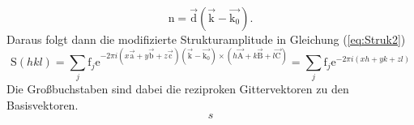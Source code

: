 \begin{equation}
 \text{n} = \vec{ \text{d}}(\vec{ \text{k}}-\vec{ \text{k}_0}).
\end{equation}
Daraus folgt dann die modifizierte Strukturamplitude in Gleichung (\ref{eq:Struk2})
\begin{equation}
\text{S}(hkl) = \sum_j \text{f}_j \text{e}^{-2\pi i (x\vec{\text{a}}+y \vec{\text{b}}+ z \vec{\text{c}}) (\vec{\text{k}}-\vec{\text{k}_0})\times (h\vec{\text{A}}+k\vec{\text{B}}+ l\vec{\text{C}}) } = \sum_j \text{f}_j \text{e}^{-2\pi i (xh+y k+ z l) }
\label{eq:Struk2}
\end{equation}
Die Großbuchstaben sind dabei die reziproken Gittervektoren zu den Basisvektoren.
\begin{equation}
s
\label{eq:g}
\end{equation}